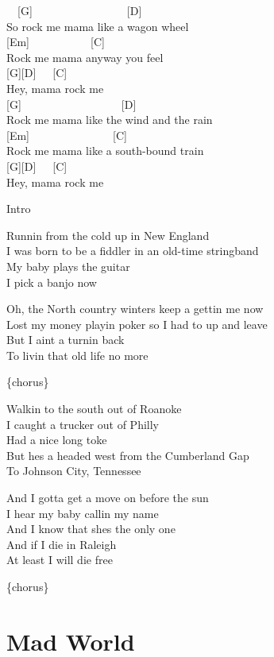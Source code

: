 \documentclass[
  letterpaper,
  twoside=false]{scrbook}
\begin{document}
~~{[}G{]}~~~~~~~~~~~~~~~~~{[}D{]}\\
So rock me mama like a wagon wheel\\
{[}Em{]}~~~~~~~~~~~{[}C{]}\\
Rock me mama anyway you feel\\
{[}G{]}{[}D{]}~~~{[}C{]}\\
Hey, mama rock me\\
{[}G{]}~~~~~~~~~~~~~~~~~~{[}D{]}\\
Rock me mama like the wind and the rain\\
{[}Em{]}~~~~~~~~~~~~~~~{[}C{]}\\
Rock me mama like a south-bound train\\
{[}G{]}{[}D{]}~~~{[}C{]}\\
Hey, mama rock me

Intro

Runnin\textquotesingle{} from the cold up in New England\\
I was born to be a fiddler in an old-time stringband\\
My baby plays the guitar\\
I pick a banjo now

Oh, the North country winters keep a gettin\textquotesingle{} me now\\
Lost my money playin\textquotesingle{} poker so I had to up and leave\\
But I ain\textquotesingle t a turnin\textquotesingle{} back\\
To livin\textquotesingle{} that old life no more

\{chorus\}

Walkin\textquotesingle{} to the south out of Roanoke\\
I caught a trucker out of Philly\\
Had a nice long toke\\
But he\textquotesingle s a headed west from the Cumberland Gap\\
To Johnson City, Tennessee

And I gotta get a move on before the sun\\
I hear my baby callin\textquotesingle{} my name\\
And I know that she\textquotesingle s the only one\\
And if I die in Raleigh\\
At least I will die free

\{chorus\}

\hypertarget{mad-world}{%
\chapter{Mad World}\label{mad-world}}
\end{document}
